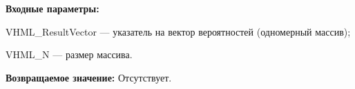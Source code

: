 \textbf{Входные параметры:}

 VHML\_ResultVector --- указатель на вектор вероятностей (одномерный массив);
 
 VHML\_N --- размер массива.

\textbf{Возвращаемое значение:}
Отсутствует.